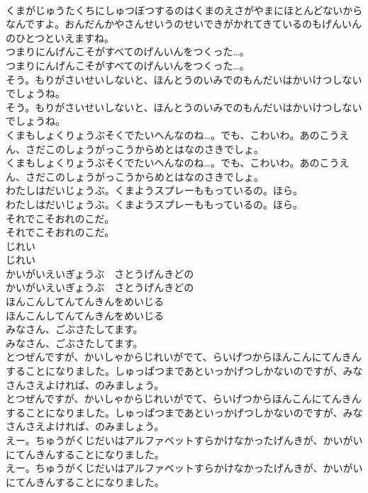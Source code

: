 \documentclass[8pt]{extreport}
\begin{document}
\begin{CJK}{UTF8}{min}
\\	くまがじゅうたくちにしゅつぼつするのはくまのえさがやまにほとんどないからなんですよ。おんだんかやさんせいうのせいできがかれてきているのもげんいんのひとつといえますね。
\\	つまりにんげんこそがすべてのげんいんをつくった…。
\\	つまりにんげんこそがすべてのげんいんをつくった…。
\\	そう。もりがさいせいしないと、ほんとうのいみでのもんだいはかいけつしないでしょうね。
\\	そう。もりがさいせいしないと、ほんとうのいみでのもんだいはかいけつしないでしょうね。
\\	くまもしょくりょうぶそくでたいへんなのね…。でも、こわいわ。あのこうえん、さだこのしょうがっこうからめとはなのさきでしょ。
\\	くまもしょくりょうぶそくでたいへんなのね…。でも、こわいわ。あのこうえん、さだこのしょうがっこうからめとはなのさきでしょ。
\\	わたしはだいじょうぶ。くまようスプレーももっているの。ほら。
\\	わたしはだいじょうぶ。くまようスプレーももっているの。ほら。
\\	それでこそおれのこだ。
\\	それでこそおれのこだ。
\\	じれい
\\	じれい
\\	かいがいえいぎょうぶ　さとうげんきどの
\\	かいがいえいぎょうぶ　さとうげんきどの
\\	ほんこんしてんてんきんをめいじる
\\	ほんこんしてんてんきんをめいじる
\\	みなさん、ごぶさたしてます。
\\	みなさん、ごぶさたしてます。
\\	とつぜんですが、かいしゃからじれいがでて、らいげつからほんこんにてんきんすることになりました。しゅっぱつまであといっかげつしかないのですが、みなさんさえよければ、のみましょう。
\\	とつぜんですが、かいしゃからじれいがでて、らいげつからほんこんにてんきんすることになりました。しゅっぱつまであといっかげつしかないのですが、みなさんさえよければ、のみましょう。
\\	えー。ちゅうがくじだいはアルファベットすらかけなかったげんきが、かいがいにてんきんすることになりました。
\\	えー。ちゅうがくじだいはアルファベットすらかけなかったげんきが、かいがいにてんきんすることになりました。

\end{CJK}
\end{document}
